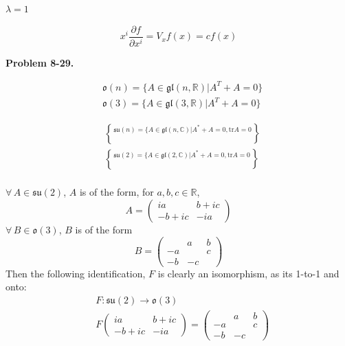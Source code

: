 \documentclass[11pt]{amsart}
\theoremstyle{definition}
\newcommand{\problemhead}[1]{\medskip\noindent\textbf{Problem #1.} }
\begin{document}
$\lambda = 1$

\[
\boxed{ x^i \frac{ \partial f}{ \partial x^i } = V_x f(x) = cf(x) }
\]


\hrulefill




\problemhead{8-29}

\[
\begin{aligned}
  & \mathfrak{o}{(n)} = \lbrace A \in \mathfrak{gl}(n,\mathbb{R}) | A^T + A = 0 \rbrace \\
  & \mathfrak{o}{(3)} = \lbrace A \in \mathfrak{gl}(3,\mathbb{R}) | A^T + A = 0 \rbrace
\end{aligned}
\]


\[
\begin{aligned}
& \mathfrak{su}(n) = \lbrace A \in \mathfrak{gl}(n,\mathbb{C}) | A^* + A = 0 , \text{tr}A = 0 \brace \\
& \mathfrak{su}(2) = \lbrace A \in \mathfrak{gl}(2,\mathbb{C}) | A^* + A = 0 , \text{tr}A = 0 \brace \\
\end{aligned}
\]

$\forall \, A \in \mathfrak{su}(2)$, $A$ is of the form, for $a,b,c \in \mathbb{R}$,
\[
A = \left( \begin{matrix} ia & b + ic \\
  -b + i c & -ia \end{matrix} \right)
\]
$\forall \, B \in \mathfrak{o}(3)$, $B$ is of the form
\[
B = \left( \begin{matrix}  & a & b \\
  -a & & c \\
  -b & -c & \end{matrix} \right)
\]
Then the following identification, $F$ is clearly an isomorphism, as its 1-to-1 and onto:
\[
\begin{aligned}
  & F : \mathfrak{su}(2) \to \mathfrak{o}(3) \\
  & F\left( \begin{matrix} ia & b + ic \\
    -b + ic & -ia \end{matrix} \right) = \left( \begin{matrix} & a & b \\
    -a & & c \\
    -b & -c & \end{matrix} \right)
\end{aligned}
\]
\end{document}
